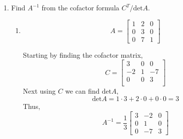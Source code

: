 \begin{enumerate}
    \item Find $A^{-1}$ from the cofactor formula $C^{T}/\text{det}A$.
        \begin{enumerate}[label=\alph*.]
            \item 
                \begin{equation}
                    A =
                    \begin{bmatrix}
                        1 & 2 & 0 \\
                        0 & 3 & 0 \\
                        0 & 7 & 1
                    \end{bmatrix}
                \end{equation}
                \begin{mdframed}[style=MyFrame]
                    Starting by finding the cofactor matrix,
                    \begin{equation}
                        C = 
                        \begin{bmatrix}
                            3   &   0       &   0   \\
                            -2  &   1       &   -7  \\
                            0   &   0       &   3   \\
                        \end{bmatrix}
                        \end{equation}
                        Next using $C$ we can find $\text{det}A$,
                        \begin{equation}
                            \text{det}A = 1\cdot 3 + 2 \cdot 0 + 0\cdot 0
                                            = 3
                        \end{equation}
                        Thus,
                        \begin{equation}
                            A^{-1} = 
                            \frac{1}{3}
                            \begin{bmatrix}
                                3       &   -2  &   0   \\
                                0       &   1   &   0   \\
                                0       &   -7  &   3
                            \end{bmatrix}
                        \end{equation}
                    \end{mdframed}

\end{enumerate}
\end{enumerate}
